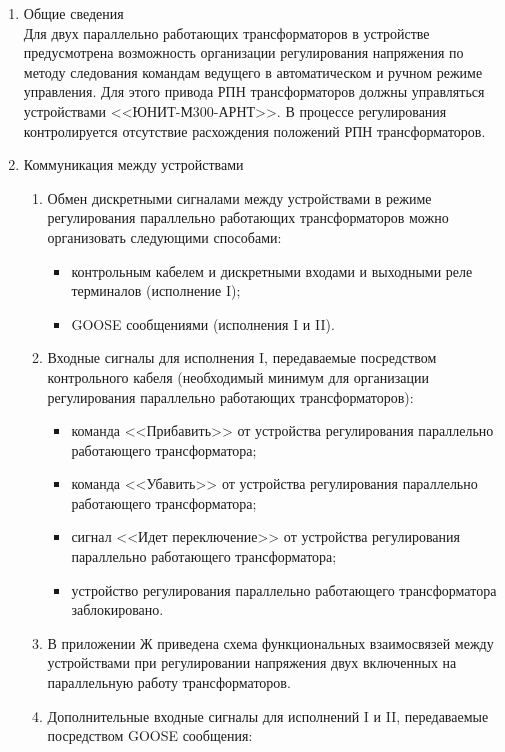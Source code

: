 \begin{enumerate}[label=\arabic{section}.\arabic{subsection}.\arabic{enumi}, labelsep=4pt, leftmargin=0pt, itemindent=57pt, itemsep=0pt, parsep=5pt]
\item Общие сведения\\
    Для двух параллельно работающих трансформаторов  в устройстве предусмотрена возможность организации регулирования напряжения по методу следования командам ведущего в автоматическом и ручном режиме управления. Для этого привода РПН трансформаторов должны управляться устройствами <<ЮНИТ-М300-АРНТ>>. В процессе регулирования контролируется отсутствие расхождения положений  РПН трансформаторов.
\item Коммуникация между устройствами
    \begin{enumerate}[label=\arabic{section}.\arabic{subsection}.\arabic{enumi}, labelsep=4pt, leftmargin=0pt, itemindent=57pt, itemsep=0pt, parsep=5pt]
        \item Обмен дискретными сигналами между устройствами в режиме регулирования параллельно работающих трансформаторов можно организовать следующими способами:
            \begin{itemize}
                \item	контрольным кабелем и дискретными входами и выходными реле терминалов (исполнение I);
                \item	GOOSE сообщениями (исполнения I и II).
            \end{itemize}
        \item Входные сигналы для исполнения I, передаваемые посредством контрольного кабеля (необходимый минимум для организации регулирования параллельно работающих трансформаторов):
            \begin{itemize}
                \item	команда <<Прибавить>> от устройства регулирования параллельно работающего трансформатора;
                \item	команда <<Убавить>> от устройства регулирования параллельно работающего трансформатора;
                \item сигнал <<Идет переключение>> от устройства регулирования параллельно работающего трансформатора;
                \item	устройство регулирования параллельно работающего трансформатора заблокировано.
            \end{itemize} 
        \item 
        В приложении Ж приведена схема функциональных взаимосвязей между устройствами при регулировании напряжения двух включенных на параллельную работу трансформаторов. 
        \item Дополнительные входные сигналы для исполнений I и II, передаваемые посредством GOOSE сообщения:

\end{enumerate}
\end{enumerate}
